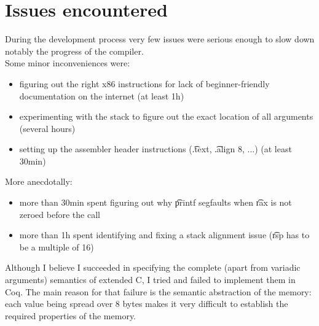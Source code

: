 \section{Issues encountered}

During the development process very few issues were serious enough to slow down notably the progress of the compiler.\\
Some minor inconveniences were:
\begin{itemize}
    \item figuring out the right x86 instructions for lack of beginner-friendly documentation on the internet (at least 1h)
    \item experimenting with the stack to figure out the exact location of all arguments (several hours)
    \item setting up the assembler header instructions (\t{.text}, \t{.align 8}, ...) (at least 30min)
\end{itemize}

More anecdotally:
\begin{itemize}
    \item more than 30min spent figuring out why \t{printf} segfaults when \t{rax} is not zeroed before the call
    \item more than 1h spent identifying and fixing a stack alignment issue (\t{rsp} has to be a multiple of 16)
\end{itemize}

Although I believe I succeeded in specifying the complete (apart from variadic arguments) semantics of extended C\textminus\textminus, I tried and failed to implement them in Coq. The main reason for that failure is the semantic abstraction of the memory: each value being spread over 8 bytes makes it very difficult to establish the required properties of the memory.
